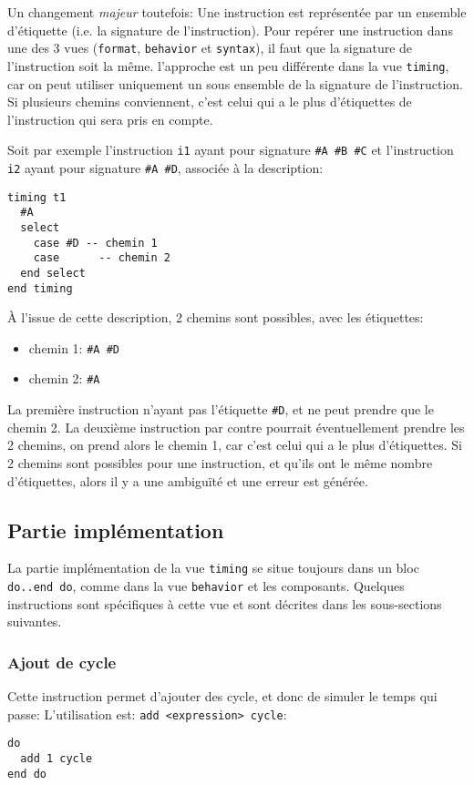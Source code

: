 Un changement \emph{majeur} toutefois: Une instruction est représentée par un ensemble d'étiquette (i.e. la signature de l'instruction). Pour repérer une instruction dans une des 3 vues (\texttt{format}, \texttt{behavior} et \texttt{syntax}), il faut que la signature de l'instruction soit la même. l'approche est un peu différente dans la vue \texttt{timing}, car on peut utiliser uniquement un sous ensemble de la signature de l'instruction. Si plusieurs chemins conviennent, c'est celui qui a le plus d'étiquettes de l'instruction qui sera pris en compte.

Soit par exemple l'instruction \texttt{i1} ayant pour signature \texttt{\#A \#B \#C} et l'instruction \texttt{i2} ayant pour signature \texttt{\#A \#D}, associée à la description:

\begin{lstlisting}
timing t1
  #A
  select 
    case #D -- chemin 1
    case      -- chemin 2
  end select
end timing
\end{lstlisting}
À l'issue de cette description, 2 chemins sont possibles, avec les étiquettes:
\begin{itemize}
\item chemin 1: \texttt{\#A \#D}
\item chemin 2: \texttt{\#A}
\end{itemize}
La première instruction n'ayant pas l'étiquette \texttt{\#D}, et ne peut prendre que le chemin 2.
La deuxième instruction par contre pourrait éventuellement prendre les 2 chemins, on prend alors le chemin 1, car c'est celui qui a le plus d'étiquettes.
Si 2 chemins sont possibles pour une instruction, et qu'ils ont le même nombre d'étiquettes, alors il y a une ambiguïté et une erreur est générée.

\subsection{Partie implémentation}
\label{sec:timingDo}
La partie implémentation de la vue \texttt{timing} se situe toujours dans un bloc \texttt{do..end do}, comme dans la vue \texttt{behavior} et les composants. Quelques instructions sont spécifiques à cette vue et sont décrites dans les sous-sections suivantes.

\subsubsection{Ajout de cycle}
Cette instruction permet d'ajouter des cycle, et donc de simuler le temps qui passe: L'utilisation est: \texttt{add <expression> cycle}:
\begin{lstlisting}
do
  add 1 cycle
end do
\end{lstlisting}

